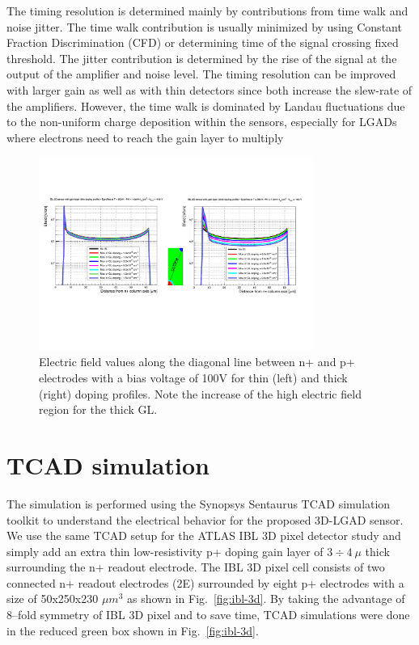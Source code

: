 \documentclass[aps,pt14,superscriptaddress,showpacs,floatfix,nofootinbib]{revtex4}
\begin{document}
The timing resolution is determined mainly by contributions from time walk and noise
jitter. The time walk contribution is usually minimized by using Constant Fraction
Discrimination (CFD) or determining time of the signal crossing fixed threshold.
The jitter contribution is determined by the rise of the signal at the output of
the amplifier and noise level. The timing resolution can be improved with larger
gain as well as with thin detectors since both increase the slew-rate of the amplifiers.
However, the time walk is dominated by Landau fluctuations due to
the non-uniform charge deposition within the sensors, especially for LGADs where
electrons need to reach the gain layer to multiply

\begin{figure}[hbtp]
\begin{center}
\includegraphics[width=0.80\textwidth,keepaspectratio]{figures1/ThinThickEfield.pdf}
\caption{Electric field values along the diagonal line between n+ and p+ electrodes with a bias voltage of 100V for thin (left) and thick (right) doping profiles. Note the increase of the high electric field region for the thick GL.\label{fig:efield}} 
\end{center}
\end{figure}

\section{TCAD simulation}
The simulation is performed using the Synopsys Sentaurus TCAD simulation toolkit
to understand the electrical behavior for the proposed 3D-LGAD sensor. 
We use the same TCAD setup for the ATLAS IBL 3D pixel detector study and
simply add an extra thin low-resistivity p+ doping gain layer of $3\div 4\ \mu$ thick
surrounding the n+ readout electrode. The IBL 3D pixel cell consists of two connected n+ 
readout electrodes (2E) surrounded by eight p+ electrodes with a size of 50x250x230 $\mu m^3$
as shown in Fig.~\ref{fig:ibl-3d}. By taking the advantage of 8--fold symmetry of IBL 3D pixel and to save time, TCAD simulations were done in the reduced green box shown in Fig.~\ref{fig:ibl-3d}. 
\end{document}
